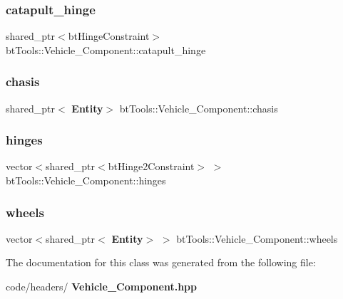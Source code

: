 \subsubsection{catapult\_hinge}
{\footnotesize\ttfamily shared\+\_\+ptr$<$bt\+Hinge\+Constraint$>$ bt\+Tools\+::\+Vehicle\+\_\+\+Component\+::catapult\+\_\+hinge}

\mbox{\label{classbt_tools_1_1_vehicle___component_a790c0da245a12f8fd6683fd5a5f2513c}} 
\subsubsection{chasis}
{\footnotesize\ttfamily shared\+\_\+ptr$<$\textbf{ Entity}$>$ bt\+Tools\+::\+Vehicle\+\_\+\+Component\+::chasis}

\mbox{\label{classbt_tools_1_1_vehicle___component_a915d6b3b22c572fed371208689b0ec35}} 
\subsubsection{hinges}
{\footnotesize\ttfamily vector$<$shared\+\_\+ptr$<$bt\+Hinge2\+Constraint$>$ $>$ bt\+Tools\+::\+Vehicle\+\_\+\+Component\+::hinges}

\mbox{\label{classbt_tools_1_1_vehicle___component_aabf0bd8846b6c0c3d1287bdbb84c5aff}} 
\subsubsection{wheels}
{\footnotesize\ttfamily vector$<$shared\+\_\+ptr$<$\textbf{ Entity}$>$ $>$ bt\+Tools\+::\+Vehicle\+\_\+\+Component\+::wheels}



The documentation for this class was generated from the following file\+:\begin{DoxyCompactItemize}
\item 
code/headers/\textbf{ Vehicle\+\_\+\+Component.\+hpp}\end{DoxyCompactItemize}
